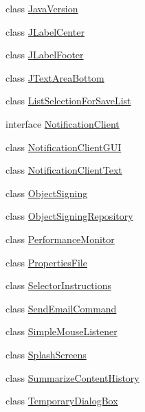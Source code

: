 \begin{DoxyCompactItemize}
class \hyperlink{classgov_1_1fnal_1_1ppd_1_1dd_1_1util_1_1JavaVersion}{Java\-Version}
\item 
class \hyperlink{classgov_1_1fnal_1_1ppd_1_1dd_1_1util_1_1JLabelCenter}{J\-Label\-Center}
\item 
class \hyperlink{classgov_1_1fnal_1_1ppd_1_1dd_1_1util_1_1JLabelFooter}{J\-Label\-Footer}
\item 
class \hyperlink{classgov_1_1fnal_1_1ppd_1_1dd_1_1util_1_1JTextAreaBottom}{J\-Text\-Area\-Bottom}
\item 
class \hyperlink{classgov_1_1fnal_1_1ppd_1_1dd_1_1util_1_1ListSelectionForSaveList}{List\-Selection\-For\-Save\-List}
\item 
interface \hyperlink{interfacegov_1_1fnal_1_1ppd_1_1dd_1_1util_1_1NotificationClient}{Notification\-Client}
\item 
class \hyperlink{classgov_1_1fnal_1_1ppd_1_1dd_1_1util_1_1NotificationClientGUI}{Notification\-Client\-G\-U\-I}
\item 
class \hyperlink{classgov_1_1fnal_1_1ppd_1_1dd_1_1util_1_1NotificationClientText}{Notification\-Client\-Text}
\item 
class \hyperlink{classgov_1_1fnal_1_1ppd_1_1dd_1_1util_1_1ObjectSigning}{Object\-Signing}
\item 
class \hyperlink{classgov_1_1fnal_1_1ppd_1_1dd_1_1util_1_1ObjectSigningRepository}{Object\-Signing\-Repository}
\item 
class \hyperlink{classgov_1_1fnal_1_1ppd_1_1dd_1_1util_1_1PerformanceMonitor}{Performance\-Monitor}
\item 
class \hyperlink{classgov_1_1fnal_1_1ppd_1_1dd_1_1util_1_1PropertiesFile}{Properties\-File}
\item 
class \hyperlink{classgov_1_1fnal_1_1ppd_1_1dd_1_1util_1_1SelectorInstructions}{Selector\-Instructions}
\item 
class \hyperlink{classgov_1_1fnal_1_1ppd_1_1dd_1_1util_1_1SendEmailCommand}{Send\-Email\-Command}
\item 
class \hyperlink{classgov_1_1fnal_1_1ppd_1_1dd_1_1util_1_1SimpleMouseListener}{Simple\-Mouse\-Listener}
\item 
class \hyperlink{classgov_1_1fnal_1_1ppd_1_1dd_1_1util_1_1SplashScreens}{Splash\-Screens}
\item 
class \hyperlink{classgov_1_1fnal_1_1ppd_1_1dd_1_1util_1_1SummarizeContentHistory}{Summarize\-Content\-History}
\item 
class \hyperlink{classgov_1_1fnal_1_1ppd_1_1dd_1_1util_1_1TemporaryDialogBox}{Temporary\-Dialog\-Box}

\end{DoxyCompactItemize}
